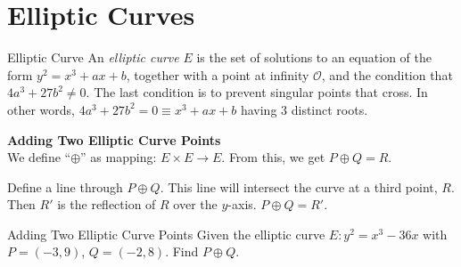 \section{Elliptic Curves}
\newcommand{\op}{\oplus}
\newcommand{\fanO}{\mathcal{O}}
\begin{definition}
    {Elliptic Curve} An \textit{elliptic curve} \(E\) is the set of solutions to an equation of the form \(y^2 = x^3 + ax + b\), together with a point at infinity \(\mathcal{O}\), and the condition that \(4a^{3} + 27b^{2} \ne 0\). The last condition is to prevent singular points that cross. In other words, \(4a^{3} + 27b^{2} = 0 \equiv x^{3} + ax + b\) having 3 distinct roots.
\end{definition}

\begin{center}
    \textbf{Adding Two Elliptic Curve Points} \\

    We define ``\(\oplus\)'' as mapping: \(E \times E \to E\). From this, we get \(P \oplus Q = R\). 
\end{center}

Define a line through \(P \op Q\). This line will intersect the curve at a third point, \(R\). Then \(R'\) is the reflection of \(R\) over the \(y\)-axis. \(P \oplus Q = R'\).

\begin{example}
    {Adding Two Elliptic Curve Points} Given the elliptic curve \(E\colon y^{2} = x^{3} - 36x\) with \(P = (-3,9)\), \(Q = (-2,8)\). Find \(P \oplus Q\).
\end{example}

